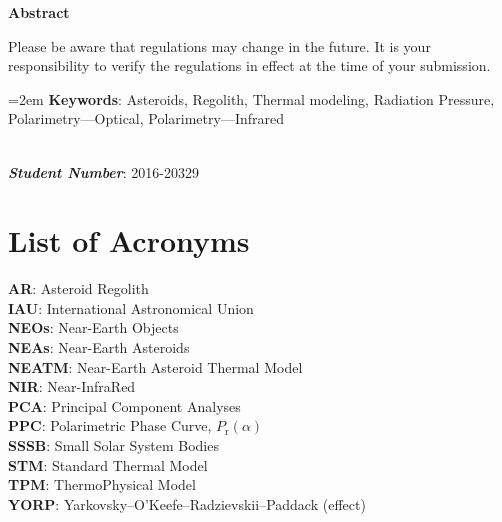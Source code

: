 \documentclass[12pt]{report}
\makeatletter
\renewcommand{\abstractname}{\large Abstract}
\renewenvironment{abstract}{%
    \if@twocolumn
    \section*{\abstractname}%
    \else
    \small
    \begin{center}%
        {\bfseries \abstractname\vspace{-.5em}\vspace{\z@}}%
    \end{center}%
    \quotation
    \fi}
{\if@twocolumn\else\endquotation\fi}
\renewenvironment{abstract}
 {\small
  \begin{center}
  \bfseries \abstractname\vspace{-.5em}\vspace{0pt}
  \end{center}
  \list{}{%
    \setlength{\leftmargin}{10mm}%
    \setlength{\rightmargin}{\leftmargin}%
  }%
  \item\relax}
 {\endlist}
\makeatother
\begin{document}
\begin{abstract}
Please be aware that regulations may change in the future. It is your responsibility to verify the regulations in effect at the time of your submission.


\hangindent=2em
\textbf{Keywords}: Asteroids, Regolith, Thermal modeling, Radiation Pressure, Polarimetry---Optical, Polarimetry---Infrared

~\\
\noindent \textbf{\textit{Student Number}}: 2016-20329

\end{abstract}


{
\setcounter{tocdepth}{2}
\tableofcontents
{}
\listoffigures
{}
\listoftables
}

\chapter*{List of Acronyms}
\noindent\textbf{AR}: Asteroid Regolith
\\
\noindent\textbf{IAU}: International Astronomical Union
\\
\noindent\textbf{NEOs}: Near-Earth Objects
\\
\noindent\textbf{NEAs}: Near-Earth Asteroids
\\
\noindent\textbf{NEATM}: Near-Earth Asteroid Thermal Model
\\
\noindent\textbf{NIR}: Near-InfraRed
\\
\noindent\textbf{PCA}: Principal Component Analyses
\\
\noindent\textbf{PPC}: Polarimetric Phase Curve, $P_\mathrm{r}(\alpha)$
\\
\noindent\textbf{SSSB}: Small Solar System Bodies
\\
\noindent\textbf{STM}: Standard Thermal Model
\\
\noindent\textbf{TPM}: ThermoPhysical Model
\\
\noindent\textbf{YORP}: Yarkovsky--O'Keefe--Radzievskii--Paddack (effect)
\end{document}
